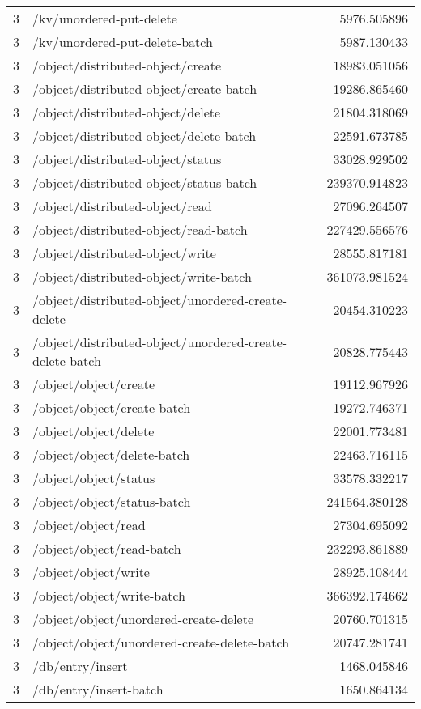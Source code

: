 \begin{longtable}{rlr}
3 & /kv/unordered-put-delete & 5976.505896 \\
3 & /kv/unordered-put-delete-batch & 5987.130433 \\
3 & /object/distributed-object/create & 18983.051056 \\
3 & /object/distributed-object/create-batch & 19286.865460 \\
3 & /object/distributed-object/delete & 21804.318069 \\
3 & /object/distributed-object/delete-batch & 22591.673785 \\
3 & /object/distributed-object/status & 33028.929502 \\
3 & /object/distributed-object/status-batch & 239370.914823 \\
3 & /object/distributed-object/read & 27096.264507 \\
3 & /object/distributed-object/read-batch & 227429.556576 \\
3 & /object/distributed-object/write & 28555.817181 \\
3 & /object/distributed-object/write-batch & 361073.981524 \\
3 & /object/distributed-object/unordered-create-delete & 20454.310223 \\
3 & /object/distributed-object/unordered-create-delete-batch & 20828.775443 \\
3 & /object/object/create & 19112.967926 \\
3 & /object/object/create-batch & 19272.746371 \\
3 & /object/object/delete & 22001.773481 \\
3 & /object/object/delete-batch & 22463.716115 \\
3 & /object/object/status & 33578.332217 \\
3 & /object/object/status-batch & 241564.380128 \\
3 & /object/object/read & 27304.695092 \\
3 & /object/object/read-batch & 232293.861889 \\
3 & /object/object/write & 28925.108444 \\
3 & /object/object/write-batch & 366392.174662 \\
3 & /object/object/unordered-create-delete & 20760.701315 \\
3 & /object/object/unordered-create-delete-batch & 20747.281741 \\
3 & /db/entry/insert & 1468.045846 \\
3 & /db/entry/insert-batch & 1650.864134 \\

\end{longtable}
